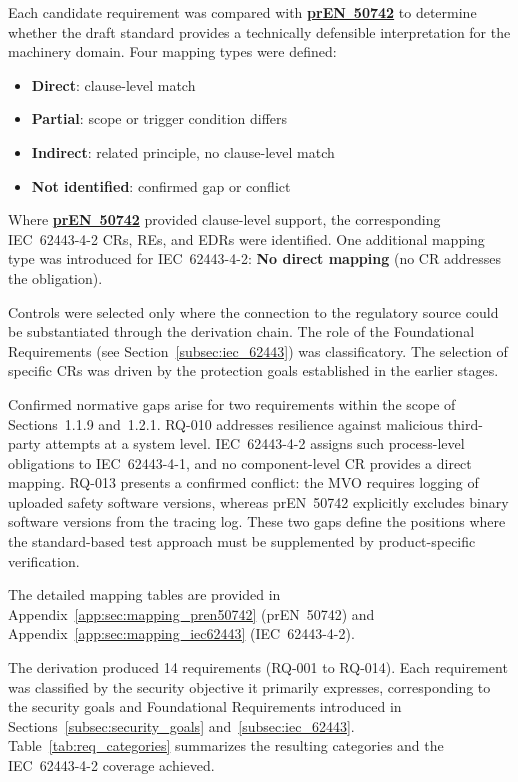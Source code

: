 Each candidate requirement was compared with \hyperref[subsec:pren_50742]{\textbf{prEN~50742}} to determine whether the draft standard provides a technically defensible interpretation for the machinery domain. Four mapping types were defined: 
\begin{itemize}
	\item \textbf{Direct}: clause-level match
	\item \textbf{Partial}: scope or trigger condition differs 
	\item \textbf{Indirect}: related principle, no clause-level match
	\item \textbf{Not identified}: confirmed gap or conflict
\end{itemize}


Where \hyperref[subsec:pren_50742]{\textbf{prEN~50742}} provided clause-level support, the corresponding IEC~62443-4-2 CRs, REs, and EDRs were identified. One additional mapping type was introduced for IEC~62443-4-2: \textbf{No direct mapping} (no CR addresses the obligation).

Controls were selected only where the connection to the regulatory source could be substantiated through the derivation chain. The role of the Foundational Requirements (see Section~\ref{subsec:iec_62443}) was classificatory. The selection of specific CRs was driven by the protection goals established in the earlier stages.

Confirmed normative gaps arise for two requirements within the scope of Sections~1.1.9 and~1.2.1. RQ-010 addresses resilience against malicious third-party attempts at a system level. IEC~62443-4-2 assigns such process-level obligations to IEC~62443-4-1, and no component-level CR provides a direct mapping. RQ-013 presents a confirmed conflict: the MVO requires logging of uploaded safety software versions, whereas prEN~50742 explicitly excludes binary software versions from the tracing log. These two gaps define the positions where the standard-based test approach must be supplemented by product-specific verification.

The detailed mapping tables are provided in Appendix~\ref{app:sec:mapping_pren50742} (prEN~50742) and Appendix~\ref{app:sec:mapping_iec62443} (IEC~62443-4-2).


The derivation produced 14 requirements (RQ-001 to RQ-014). Each requirement was classified by the security objective it primarily expresses, corresponding to the security goals and Foundational Requirements introduced in Sections~\ref{subsec:security_goals} and~\ref{subsec:iec_62443}. Table~\ref{tab:req_categories} summarizes the resulting categories and the IEC~62443-4-2 coverage achieved.

